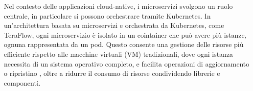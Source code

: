 \newline Nel contesto delle applicazioni cloud-native, i microservizi svolgono un ruolo centrale, in particolare si possono orchestrare tramite Kubernetes.
In un'architettura basata su microservizi e orchestrata da Kubernetes, come TeraFlow,  %
ogni microservizio è isolato in un cointainer che può avere più istanze, ognuna rappresentata da un pod.
Questo consente una gestione delle risorse più efficiente rispetto alle macchine virtuali (VM) tradizionali,
dove ogni istanza necessita di un sistema operativo completo,
e facilita operazioni di aggiornamento o ripristino \cite{artkub}, 
oltre a ridurre il consumo di risorse
condividendo librerie e componenti.


